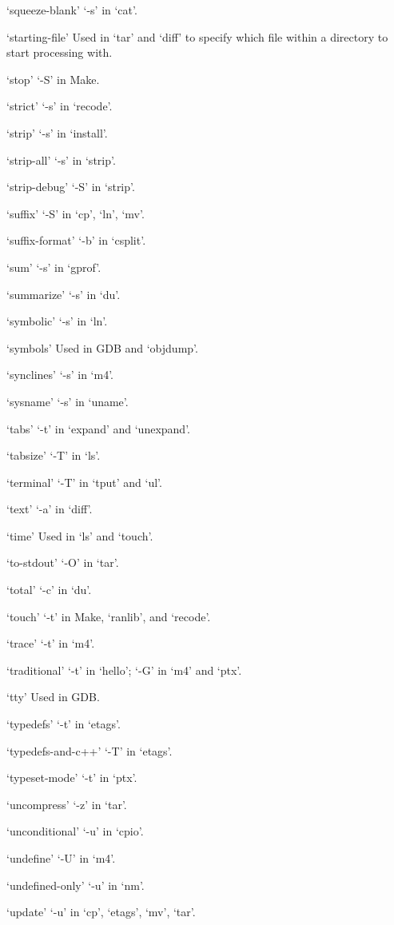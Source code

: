 `squeeze-blank'
     `-s' in `cat'.

`starting-file'
     Used in `tar' and `diff' to specify which file within a directory
     to start processing with.

`stop'
     `-S' in Make.

`strict'
     `-s' in `recode'.

`strip'
     `-s' in `install'.

`strip-all'
     `-s' in `strip'.

`strip-debug'
     `-S' in `strip'.

`suffix'
     `-S' in `cp', `ln', `mv'.

`suffix-format'
     `-b' in `csplit'.

`sum'
     `-s' in `gprof'.

`summarize'
     `-s' in `du'.

`symbolic'
     `-s' in `ln'.

`symbols'
     Used in GDB and `objdump'.

`synclines'
     `-s' in `m4'.

`sysname'
     `-s' in `uname'.

`tabs'
     `-t' in `expand' and `unexpand'.

`tabsize'
     `-T' in `ls'.

`terminal'
     `-T' in `tput' and `ul'.

`text'
     `-a' in `diff'.

`time'
     Used in `ls' and `touch'.

`to-stdout'
     `-O' in `tar'.

`total'
     `-c' in `du'.

`touch'
     `-t' in Make, `ranlib', and `recode'.

`trace'
     `-t' in `m4'.

`traditional'
     `-t' in `hello'; `-G' in `m4' and `ptx'.

`tty'
     Used in GDB.

`typedefs'
     `-t' in `etags'.

`typedefs-and-c++'
     `-T' in `etags'.

`typeset-mode'
     `-t' in `ptx'.

`uncompress'
     `-z' in `tar'.

`unconditional'
     `-u' in `cpio'.

`undefine'
     `-U' in `m4'.

`undefined-only'
     `-u' in `nm'.

`update'
     `-u' in `cp', `etags', `mv', `tar'.

